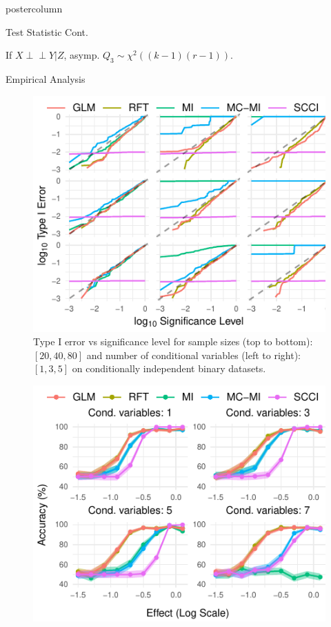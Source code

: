 \documentclass{beamer}
\def\ci{\perp\!\!\!\!\!\perp}
\begin{document}
\begin{frame}
\begin{columns}
\begin{column}{.33\textwidth}
\begin{beamercolorbox}[center]{postercolumn}
\begin{minipage}{.98\textwidth}
{\begin{myblock}{Test Statistic Cont.}
\begin{itemize}
			If $ X \ci Y | Z $, asymp. $ Q_3 \sim \chi^2((k-1)(r-1)) $.
		\end{itemize}

	\end{myblock}\vfill
	\begin{myblock}{Empirical Analysis}
		\begin{figure}
			\centering
			\includegraphics[scale=3]{../in_person/imgs/calibration_add_vars.pdf}
			\caption{Type I error vs significance level for sample sizes (top to
			bottom): $ [20, 40, 80] $ and number of conditional variables (left to
			right): $ [1, 3, 5] $ on conditionally independent binary datasets.}
			\label{fig:calibration}
		\end{figure}
		\begin{figure}
			\centering
			\includegraphics[scale=3]{../in_person/imgs/accuracy.pdf}

\end{figure}
\end{myblock}}
\end{minipage}
\end{beamercolorbox}
\end{column}
\end{columns}
\end{frame}
\end{document}
